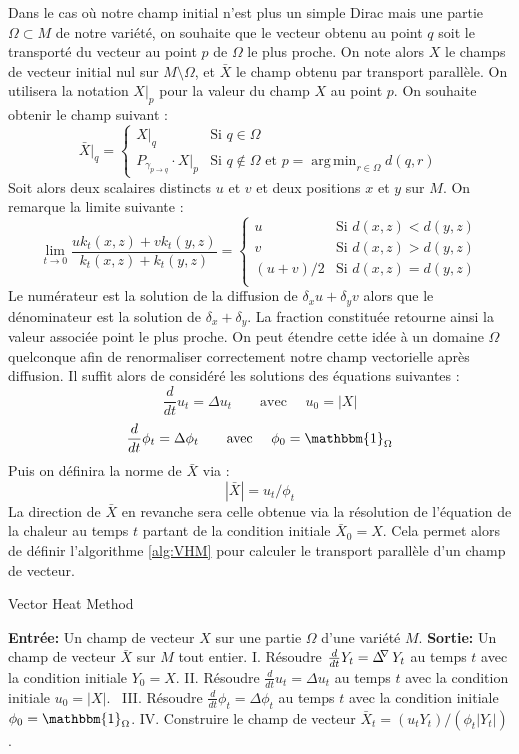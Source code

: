 \documentclass[11pt]{article}
\newcommand{\syst}[2]{\left\{ \begin{array}{#1} #2 \end{array} \right.}
\DeclareMathOperator{\connexionLaplacian}{\Delta^{\hspace{-3pt} \nabla}}
\DeclareMathOperator*{\argmin}{arg\,min}
\begin{document}
	Dans le cas où notre champ initial n'est plus un simple Dirac mais une partie $\Omega \subset M$ de notre variété, on souhaite que le vecteur obtenu au point $q$ soit le transporté du vecteur au point $p$ de $\Omega$ le plus proche. On note alors $X$ le champs de vecteur initial nul sur $M \setminus \Omega$, et $\bar{X}$ le champ obtenu par transport parallèle. On utilisera la notation $X|_p$ pour la valeur du champ $X$ au point $p$. On souhaite obtenir le champ suivant :
	$$ \bar{X}|_q = \syst{ll}{
		X|_q & \text{Si } q \in \Omega \\
		P_{\gamma_{p \rightarrow q}} \cdot X|_p & \text{Si } q \notin \Omega \text{ et } p = \argmin_{r \in \Omega} d(q, r)
	} $$
	Soit alors deux scalaires distincts $u$ et $v$ et deux positions $x$ et $y$ sur $M$. On remarque la limite suivante :
	$$ \lim_{t \rightarrow 0} \frac{u k_t(x, z) + v k_t(y, z)}{k_t(x, z) + k_t(y, z)} = \syst{ll}{
		u & \text{Si } d(x, z) < d(y, z) \\
		v & \text{Si } d(x, z) > d(y, z) \\
		(u+v) / 2 & \text{Si } d(x, z) = d(y, z) \\
	} $$
	Le numérateur est la solution de la diffusion de $\delta_x u + \delta_y v$ alors que le dénominateur est la solution de $\delta_x + \delta_y$. La fraction constituée retourne ainsi la valeur associée point le plus proche. On peut étendre cette idée à un domaine $\Omega$ quelconque afin de renormaliser correctement notre champ vectorielle après diffusion. Il suffit alors de considéré les solutions des équations suivantes :
	$$ \frac{d}{dt} u_t = \Delta u_t \qquad \text{avec } \quad u_0 = | X | $$
	$$ \frac{d}{dt} \phi_t = \Delta \phi_t \qquad \text{avec } \quad \phi_0 = \mathbbm{1}_\Omega $$
	Puis on définira la norme de $\bar{X}$ via :
	$$ | \bar{X} | = u_t / \phi_t $$
	La direction de $\bar{X}$ en revanche sera celle obtenue via la résolution de l'équation de la chaleur au temps $t$ partant de la condition initiale $\bar{X}_0 = X$. Cela permet alors de définir l'algorithme \ref{alg:VHM} pour calculer le transport parallèle d'un champ de vecteur.
	\begin{algorithm}[h]
		\caption{Vector Heat Method}
		\label{alg:VHM}
		\begin{algorithmic}
			\State \textbf{Entrée:} Un champ de vecteur $X$ sur une partie $\Omega$ d'une variété $M$.
			\State \textbf{Sortie:} Un champ de vecteur $\bar{X}$ sur $M$ tout entier.
			\State \hspace{10pt} I. \; Résoudre $\frac{d}{dt} Y_t = \connexionLaplacian Y_t$ au temps $t$ avec la condition initiale $Y_0 = X$.
			\State \hspace{6pt} II. \; Résoudre $\frac{d}{dt} u_t = \Delta u_t$ au temps $t$ avec la condition initiale $u_0 = |X|$.
			\State \, III. \; Résoudre $\frac{d}{dt} \phi_t = \Delta \phi_t$ au temps $t$ avec la condition initiale $\phi_0 = \mathbbm{1}_\Omega$.
			\State \hspace{3pt} IV. \; Construire le champ de vecteur $\bar{X}_t = ( u_t Y_t) / (\phi_t |Y_t|)$.
		\end{algorithmic}
	\end{algorithm}
\end{document}
